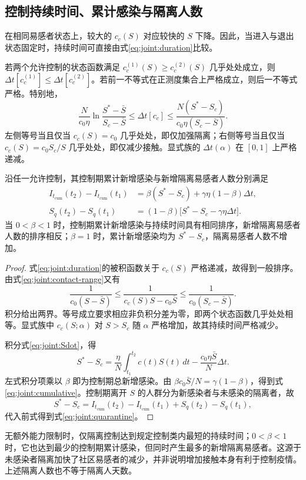 \documentclass[lang=cn,a4paper,newtx]{elegantpaper}
\numberwithin{equation}{section}
\theoremstyle{plain}
\newcommand{\Itcum}{I_{t_{\mathrm{cum}}}}
\begin{document}
\subsection{控制持续时间、累计感染与隔离人数}
在相同易感者状态上，较大的 $c_c(S)$ 对应较快的 $S$ 下降。因此，当进入与退出状态固定时，持续时间可直接由式\eqref{eq:joint:duration}比较。
\begin{theorem}
\label{thm:joint:comparison}
若两个允许控制的状态函数满足 $c_c^{(1)}(S)\ge c_c^{(2)}(S)$ 几乎处处成立，则
$\Delta t[c_c^{(1)}]\le\Delta t[c_c^{(2)}]$。若前一不等式在正测度集合上严格成立，则后一不等式严格。特别地，
\begin{equation}
\frac{N}{c_0\eta}\ln\frac{S^*-\bar S}{S_c-\bar S}
\le\Delta t[c_c]\le
\frac{N(S^*-S_c)}{c_0\eta(S_c-\bar S)}.
\label{eq:joint:duration-bounds}
\end{equation}
左侧等号当且仅当 $c_c(S)=c_0$ 几乎处处，即仅加强隔离；右侧等号当且仅当 $c_c(S)=c_0S_c/S$ 几乎处处，即仅减少接触。显式族的 $\Delta t(\alpha)$ 在 $[0,1]$ 上严格递减。

沿任一允许控制，其控制期累计新增感染与新增隔离易感者人数分别满足
\begin{align}
\Itcum(t_2)-\Itcum(t_1)
&=\beta(S^*-S_c)+\gamma\eta(1-\beta)\Delta t,
\label{eq:joint:cumulative}\\
S_q(t_2)-S_q(t_1)
&=(1-\beta)\bigl[S^*-S_c-\gamma\eta\Delta t\bigr].
\label{eq:joint:quarantine}
\end{align}
当 $0<\beta<1$ 时，控制期累计新增感染与持续时间具有相同排序，新增隔离易感者人数的排序相反；$\beta=1$ 时，累计新增感染均为 $S^*-S_c$，隔离易感者人数不增加。
\end{theorem}
\begin{proof}
式\eqref{eq:joint:duration}的被积函数关于 $c_c(S)$ 严格递减，故得到一般排序。由式\eqref{eq:joint:contact-range}又有
\[
\frac1{c_0(S-\bar S)}\le
\frac1{c_c(S)S-c_0\bar S}\le
\frac1{c_0(S_c-\bar S)}.
\]
积分给出两界。等号成立要求相应非负积分差为零，即两个状态函数几乎处处相等。显式族中 $c_c(S;\alpha)$ 对 $S>S_c$ 随 $\alpha$ 严格增加，故其持续时间严格减少。

积分式\eqref{eq:joint:Sdot}，得
\[
S^*-S_c=\frac{\eta}{N}\int_{t_1}^{t_2}c(t)S(t)\,dt
-\frac{c_0\eta\bar S}{N}\Delta t.
\]
左式积分项乘以 $\beta$ 即为控制期总新增感染。由 $\beta c_0\bar S/N=\gamma(1-\beta)$，得到式\eqref{eq:joint:cumulative}。控制期离开 $S$ 的人群分为新感染者与未感染的隔离者，故
\[
S^*-S_c=\Itcum(t_2)-\Itcum(t_1)+S_q(t_2)-S_q(t_1),
\]
代入前式得到式\eqref{eq:joint:quarantine}。
\end{proof}
无额外能力限制时，仅隔离控制达到规定控制类内最短的持续时间；$0<\beta<1$ 时，它也达到最少的控制期累计感染，但同时产生最多的新增隔离易感者。这源于未感染者隔离加快了社区易感者的减少，并非说明增加接触本身有利于控制疫情。上述隔离人数也不等于隔离人天数。
\end{document}
